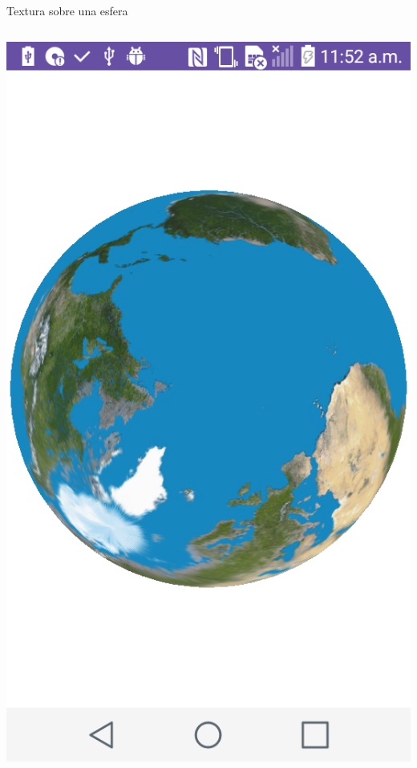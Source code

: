 \documentclass[aspectratio=169,compress]{beamer}
\begin{document}
\begin{frame}{Textura sobre una esfera}
\begin{columns}
\begin{column}{0.3\textwidth}
\begin{center}
\includegraphics[width=1.0\linewidth]{PantallazosDemoTaller/Demo10.png}
\end{center}
\end{column}
\end{columns}
\end{frame}
\end{document}
